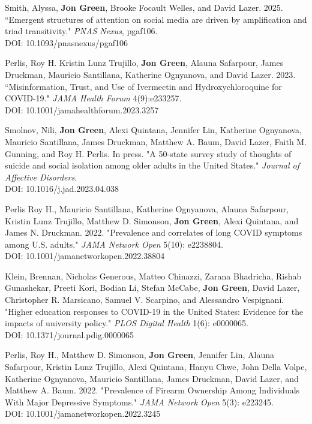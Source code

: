 \documentclass[letterpaper]{article}
\begin{document}
\begin{etaremune}

\item Smith, Alyssa, \textbf{Jon Green}, Brooke Focault Welles, and David Lazer. 2025. ``Emergent structures of attention on social media are driven by amplification and triad transitivity." \textit{PNAS Nexus}, pgaf106.\\
DOI: 10.1093/pnasnexus/pgaf106

\item Perlis, Roy H. Kristin Lunz Trujillo, \textbf{Jon Green}, Alauna Safarpour, James Druckman, Mauricio Santillana, Katherine Ognyanova, and David Lazer. 2023. ``Misinformation, Trust, and Use of Ivermectin and Hydroxychloroquine for COVID-19." \textit{JAMA Health Forum} 4(9):e233257. \\
DOI: 10.1001/jamahealthforum.2023.3257

\item Smolnov, Nili, \textbf{Jon Green}, Alexi Quintana, Jennifer Lin, Katherine Ognyanova, Mauricio Santillana, James Druckman, Matthew A. Baum, David Lazer, Faith M. Gunning, and Roy H. Perlis. In press. "A 50-state survey study of thoughts of suicide and social isolation among older adults in the United States." \textit{Journal of Affective Disorders}. \\
DOI: 10.1016/j.jad.2023.04.038

\item Perlis Roy H., Mauricio Santillana, Katherine Ognyanova, Alauna Safarpour, Kristin Lunz Trujillo, Matthew D. Simonson, \textbf{Jon Green}, Alexi Quintana, and James N. Druckman. 2022. "Prevalence and correlates of long COVID symptoms among U.S. adults." \textit{JAMA Network Open} 5(10): e2238804. \\
DOI: 10.1001/jamanetworkopen.2022.38804

\item Klein, Brennan, Nicholas Generous, Matteo Chinazzi, Zarana Bhadricha, Rishab Gunashekar, Preeti Kori, Bodian Li, Stefan McCabe, \textbf{Jon Green}, David Lazer, Christopher R. Marsicano, Samuel V. Scarpino, and Alessandro Vespignani. "Higher education responses to COVID-19 in the United States: Evidence for the impacts of university policy." \textit{PLOS Digital Health} 1(6): e0000065. \\
DOI: 10.1371/journal.pdig.0000065

\item  Perlis, Roy H., Matthew D. Simonson, \textbf{Jon Green}, Jennifer Lin, Alauna Safarpour, Kristin Lunz Trujillo, Alexi Quintana, Hanyu Chwe, John Della Volpe, Katherine Ognyanova, Mauricio Santillana,  James Druckman, David Lazer, and Matthew A. Baum. 2022. "Prevalence of Firearm Ownership Among Individuals With Major Depressive Symptoms." \textit{JAMA Network Open} 5(3): e223245. \\
DOI: 10.1001/jamanetworkopen.2022.3245


\end{etaremune}
\end{document}
